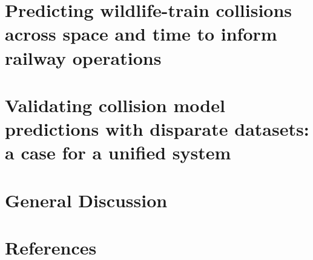 \documentclass[titlesmallcaps,copyrightpage,examinerscopy]{uomthesis}
\begin{document}
%
\chapter{Predicting wildlife-train collisions across space and time to inform railway operations}\label{sec:train}
\clearpage{\pagestyle{empty}\cleardoublepage}

%
\chapter{Validating collision model predictions with disparate datasets: a case for a unified system}\label{sec:val}
\clearpage{\pagestyle{empty}\cleardoublepage}

%
\chapter{General Discussion}\label{sec:conc}
\clearpage{\pagestyle{empty}\cleardoublepage}

%

{
\backmatter
\chapter{References}

\clearpage{\pagestyle{empty}\cleardoublepage}
}

\let\svaddcontentsline\addcontentsline %
\renewcommand\addcontentsline[3]{%
  \ifthenelse{\equal{#1}{lof}}{}%
  {\ifthenelse{\equal{#1}{lot}}{}{\svaddcontentsline{#1}{#2}{#3}}}}

\clearpage
\appendix
{}
\clearpage{\pagestyle{empty}\cleardoublepage}


\clearpage{\pagestyle{empty}\cleardoublepage}


\clearpage{\pagestyle{empty}\cleardoublepage}
\end{document}
